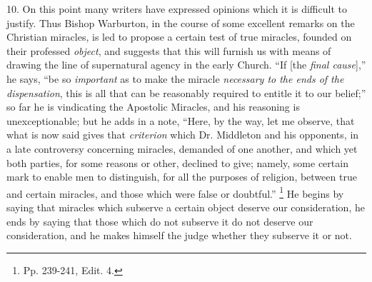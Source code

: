 10.
On this point many writers have expressed opinions which it is
difficult to justify. Thus Bishop Warburton, in the course of some
excellent remarks on the Christian miracles, is led to propose a
certain test of true miracles, founded on their professed \emph{object},
and suggests that this will furnish us with means of drawing the line
of supernatural agency in the early Church. ``If [the \emph{final cause}],''
he says, ``be so \emph{important} as to make the miracle \emph{necessary
to the ends of the dispensation}, this is all that can be
reasonably required to entitle it to our belief;'' so far he is
vindicating the Apostolic Miracles, and his reasoning is
unexceptionable; but he adds in a note, ``Here, by the way, let me
observe, that what is now said gives that \emph{criterion} which Dr.
Middleton and his opponents, in a late controversy concerning
miracles, demanded of one another, and which yet both parties, for
some reasons or other, declined to give; namely, some certain mark to
enable men to distinguish, for all the purposes of religion, between
true and certain miracles, and those which were false or
doubtful.'' \footnote{Pp. 239-241, Edit. 4.} He begins
by saying that miracles which subserve a certain object deserve our
consideration, he ends by saying that those which do not subserve it
do not deserve our consideration, and he makes himself the judge
whether they subserve it or not.

